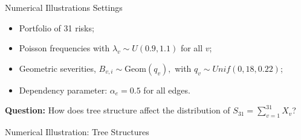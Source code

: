 \documentclass[11pt,xcolor={dvipsnames},hyperref={pdftex,pdfpagemode=UseNone,hidelinks,pdfdisplaydoctitle=true},usepdftitle=false]{beamer}
\begin{document}
\begin{frame}{Numerical Illustrations Settings}
\begin{itemize}
    \item Portfolio of 31 risks;
    \item Poisson frequencies with $\lambda_v \sim  U(0.9,1.1)$ for all $v$;
    \item Geometric severities, $B_{v,i} \sim \text{Geom}(q_v),$ with $q_v \sim Unif(0,18, 0.22)$;
    \item Dependency parameter: $\alpha_e = 0.5$ for all edges.
\end{itemize}
\begin{center}

\end{center}
\textbf{Question:} How does tree structure affect the distribution of $S_{31} = \sum_{v=1}^{31} X_v$?
\end{frame}

\begin{frame}{Numerical Illustration: Tree Structures}
\begin{center}
\vfill
{}
\vfill

\end{center}
\end{frame}
\end{document}

